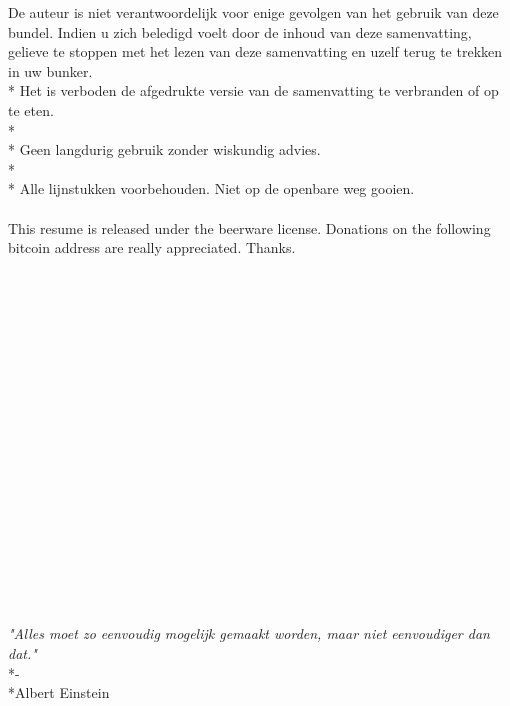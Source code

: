\documentclass[12pt]{article}
\begin{document}
De auteur is niet verantwoordelijk voor enige gevolgen van het gebruik van deze bundel. Indien u zich beledigd voelt door de inhoud van deze samenvatting, gelieve te stoppen met het lezen van deze samenvatting en uzelf terug te trekken in uw bunker.\\*
Het is verboden de afgedrukte versie van de samenvatting te verbranden of op te eten.\\*\\*
Geen langdurig gebruik zonder wiskundig advies.\\*\\*
Alle lijnstukken voorbehouden. Niet op de openbare weg gooien.\\\\
This resume is released under the beerware license. Donations on the following bitcoin address are really appreciated. Thanks.\\\\\\\\\\\\\\\\\\\\\\\\\\\\\\\\\\\\\\
\begin{center}
\textit{"Alles moet zo eenvoudig mogelijk gemaakt worden, maar niet eenvoudiger dan dat."}\\*-\\*Albert Einstein
\end{center}
\end{document}

